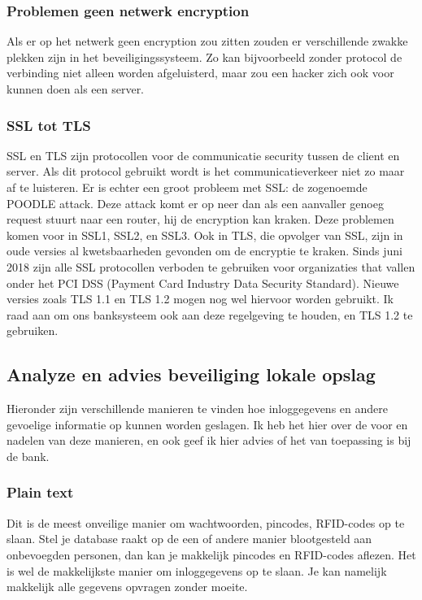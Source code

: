 \documentclass{article}
\begin{document}
\subsubsection{Problemen geen netwerk encryption}

Als er op het netwerk geen encryption zou zitten zouden er verschillende zwakke plekken zijn in het beveiligingssysteem.
Zo kan bijvoorbeeld zonder protocol de verbinding niet alleen worden afgeluisterd, maar zou een hacker zich ook voor kunnen doen als een server.

\subsubsection{SSL tot TLS}

SSL en TLS zijn protocollen voor de communicatie security tussen de client en server.
Als dit protocol gebruikt wordt is het communicatieverkeer niet zo maar af te luisteren.
Er is echter een groot probleem met SSL: de zogenoemde POODLE attack.
Deze attack komt er op neer dan als een aanvaller genoeg request stuurt naar een router, hij de encryption kan kraken.
Deze problemen komen voor in SSL1, SSL2, en SSL3.
Ook in TLS, die opvolger van SSL, zijn in oude versies al kwetsbaarheden gevonden om de encryptie te kraken.
Sinds juni 2018 zijn alle SSL protocollen verboden te gebruiken voor organizaties that vallen onder het PCI DSS (Payment Card Industry Data Security Standard).
Nieuwe versies zoals TLS 1.1 en TLS 1.2 mogen nog wel hiervoor worden gebruikt.
Ik raad aan om ons banksysteem ook aan deze regelgeving te houden, en TLS 1.2 te gebruiken.

\subsection{Analyze en advies beveiliging lokale opslag} 

Hieronder zijn verschillende manieren te vinden hoe inloggegevens en andere gevoelige informatie op kunnen worden geslagen.
Ik heb het hier over de voor en nadelen van deze manieren, en ook geef ik hier advies of het van toepassing is bij de bank.

\subsubsection{Plain text}

Dit is de meest onveilige manier om wachtwoorden, pincodes, RFID-codes op te slaan.
Stel je database raakt op de een of andere manier blootgesteld aan onbevoegden personen, dan kan je makkelijk pincodes en RFID-codes aflezen. 
Het is wel de makkelijkste manier om inloggegevens op te slaan.
Je kan namelijk makkelijk alle gegevens opvragen zonder moeite.
\end{document}
